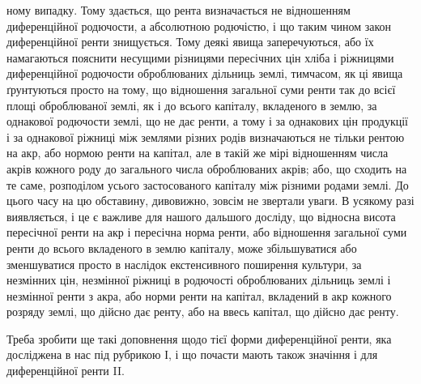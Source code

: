 ному випадку. Тому здається, що рента визначається не відношенням диференційної
родючости, а абсолютною родючістю, і що таким чином закон диференційної
ренти знищується. Тому деякі явища заперечуються, або їх намагаються
пояснити несущими різницями пересічних цін хліба і ріжницями диференційної
родючости оброблюваних дільниць землі, тимчасом, як ці явища ґрунтуються
просто на тому, що відношення загальної суми ренти так до всієї площі оброблюваної
землі, як і до всього капіталу, вкладеного в землю, за однакової родючости
землі, що не дає ренти, а тому і за однакових цін продукції і за
однакової ріжниці між землями різних родів визначаються не тільки рентою
на акр, або нормою ренти на капітал, але в такій же мірі відношенням числа
акрів кожного роду до загального числа оброблюваних акрів; або, що сходить
на те саме, розподілом усього застосованого капіталу між різними родами землі.
До цього часу на цю обставину, дивовижно, зовсім не звертали уваги. В усякому
разі виявляється, і це є важливе для нашого дальшого досліду, що відносна
висота пересічної ренти на акр і пересічна норма ренти, або відношення
загальної суми ренти до всього вкладеного в землю капіталу, може збільшуватися
або зменшуватися просто в наслідок екстенсивного поширення культури,
за незмінних цін, незмінної ріжниці в родючості оброблюваних дільниць землі
і незмінної ренти з акра, або норми ренти на капітал, вкладений в акр
кожного розряду землі, що дійсно дає ренту, або на ввесь капітал, що дійсно
дає ренту.

Треба зробити ще такі доповнення щодо тієї форми диференційної ренти,
яка досліджена в нас під рубрикою І, і що почасти мають також значіння і
для диференційної ренти II.

